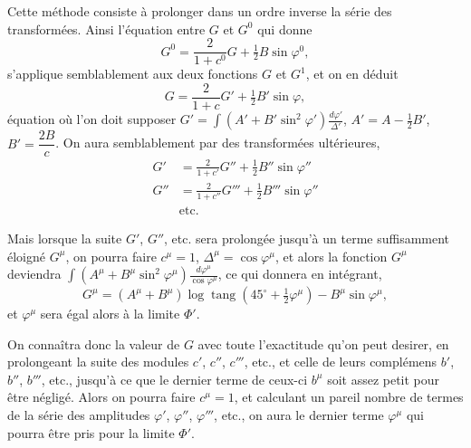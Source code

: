 \documentclass{article}
\begin{document}
Cette méthode consiste à prolonger dans un ordre inverse la série des transformées. Ainsi l'équation entre $G$ et $G^{0}$ qui donne
\[ G^{0}=\frac{2}{1+c^{0}}G+\tfrac{1}{2}B\sin\varphi^{0}, \]
s'applique semblablement aux deux fonctions $G$ et $G^{1}$, et on en déduit
\[ G=\frac{2}{1+c}G'+\tfrac{1}{2}B'\sin\varphi, \]
équation où l'on doit supposer $G'=\displaystyle\int(A'+B'\sin^{2}\varphi')\frac{d\varphi'}{\Delta'}$, $A'=A-\frac{1}{2}B'$, $B'=\dfrac{2B}{c}$. On aura semblablement par des transformées ultérieures,
\[ \begin{aligned} G'&=\frac{2}{1+c'}G''+\tfrac{1}{2}B''\sin\varphi''\\ G''&=\frac{2}{1+c''}G'''+\tfrac{1}{2}B'''\sin\varphi''\\ &\text{etc.} \end{aligned} \]

Mais lorsque la suite $G'$, $G''$, etc. sera prolongée jusqu'à un terme suffisamment éloigné $G^{\mu}$, on pourra faire $c^{\mu}=1$, $\Delta^{\mu}=\cos\varphi^{\mu}$, et alors la fonction $G^{\mu}$ deviendra $\displaystyle\int(A^{\mu}+B^{\mu}\sin^{2}\varphi^{\mu})\frac{d\varphi^{\mu}}{\cos\varphi^{\mu}}$, ce qui donnera en intégrant,
\[ G^{\mu}=(A^{\mu}+B^{\mu})\log\operatorname{tang}(45^{\circ}+\tfrac{1}{2}\varphi^{\mu})-B^{\mu}\sin\varphi^{\mu}, \]
et $\varphi^{\mu}$ sera égal alors à la limite $\Phi'$.

On connaîtra donc la valeur de $G$ avec toute l'exactitude qu'on peut desirer, en prolongeant la suite des modules $c'$, $c''$, $c'''$, etc., et celle de leurs complémens $b'$, $b''$, $b'''$, etc., jusqu'à ce que le dernier terme de ceux-ci $b^{\mu}$ soit assez petit pour être négligé. Alors on pourra faire $c^{\mu}=1$, et calculant un pareil nombre de termes de la série des amplitudes $\varphi'$, $\varphi''$, $\varphi'''$, etc., on aura le dernier terme $\varphi^{\mu}$ qui pourra être pris pour la limite $\Phi'$.
\end{document}
